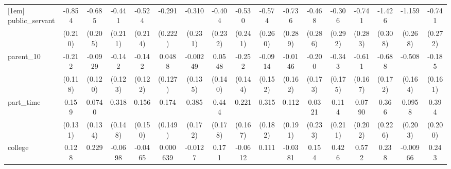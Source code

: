 {\begin{tabular}{l*{16}{c}}
[1em]
public\_servant      &      -0.854\sym{***}&      -0.685\sym{***}&      -0.441\sym{*}  &      -0.524\sym{*}  &      -0.291         &      -0.310         &      -0.404         &      -0.530\sym{*}  &      -0.574\sym{*}  &      -0.736\sym{*}  &      -0.468         &      -0.306         &      -0.741\sym{**} &      -1.426\sym{***}&      -1.159\sym{***}&      -0.741\sym{**} \\
                    &     (0.210)         &     (0.205)         &     (0.211)         &     (0.214)         &     (0.222)         &     (0.231)         &     (0.232)         &     (0.241)         &     (0.260)         &     (0.289)         &     (0.286)         &     (0.292)         &     (0.283)         &     (0.308)         &     (0.268)         &     (0.272)         \\
[1em]
parent\_10           &      -0.212         &     -0.0929         &      -0.142         &      -0.142         &      0.0488         &    -0.00249         &      0.0548         &      -0.252         &     -0.0914         &     -0.0146         &      -0.200         &      -0.343\sym{*}  &      -0.611\sym{***}&      -0.688\sym{***}&      -0.508\sym{**} &      -0.185         \\
                    &     (0.118)         &     (0.120)         &     (0.123)         &     (0.122)         &     (0.127)         &     (0.135)         &     (0.140)         &     (0.144)         &     (0.152)         &     (0.162)         &     (0.173)         &     (0.175)         &     (0.167)         &     (0.172)         &     (0.164)         &     (0.161)         \\
[1em]
part\_time           &       0.159         &      0.0740         &       0.318\sym{*}  &       0.156         &       0.174         &       0.385\sym{*}  &       0.444\sym{*}  &       0.221         &       0.315         &       0.112         &      0.0321         &       0.114         &      0.0790         &       0.366         &      0.0958         &       0.394\sym{*}  \\
                    &     (0.131)         &     (0.134)         &     (0.148)         &     (0.150)         &     (0.149)         &     (0.172)         &     (0.178)         &     (0.167)         &     (0.182)         &     (0.191)         &     (0.233)         &     (0.211)         &     (0.202)         &     (0.226)         &     (0.203)         &     (0.200)         \\
[1em]
college             &       0.128         &       0.229         &     -0.0698         &     -0.0465         &    0.000639         &     -0.0127         &       0.171         &     -0.0612         &       0.111         &     -0.0381         &       0.154         &       0.426\sym{*}  &       0.572\sym{**} &       0.238         &    -0.00966         &       0.243         \\

\end{tabular}}
